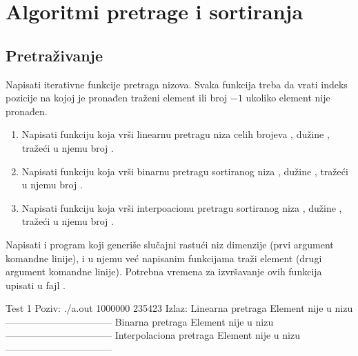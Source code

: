 
\chapter{Algoritmi pretrage i sortiranja}

\section{Pretraživanje}

\begin{Exercise}[label=401]
  Napisati iterativne funkcije pretraga nizova. Svaka funkcija treba
  da vrati indeks pozicije na kojoj je pronađen traženi element ili
  broj $-1$ ukoliko element nije pronađen.
  \begin{enumerate}  
  \item Napisati funkciju koja vrši linearnu pretragu niza 
    celih brojeva , dužine , tražeći u njemu broj
    .  
  \item Napisati funkciju koja vrši binarnu pretragu
    sortiranog niza , dužine , tražeći u njemu broj .
  \item Napisati funkciju koja vrši interpoacionu pretragu
    sortiranog niza , dužine , tražeći u njemu broj .
  \end{enumerate}
  Napisati i program koji generiše slučajni rastući niz dimenzije
   (prvi argument komandne linije), i u njemu već napisanim
  funkcijama traži element  (drugi argument komandne
  linije). Potrebna vremena za izvršavanje ovih funkcija upisati u
  fajl .
  
\begin{maxitest}
\begin{test}{Test 1}
Poziv: ./a.out 1000000 235423
Izlaz:
Linearna pretraga
Element nije u nizu
---------------------------------
Binarna pretraga
Element nije u nizu
---------------------------------
Interpolaciona pretraga
Element nije u nizu
---------------------------------
\end{test}
\end{maxitest}


\end{Exercise}

\begin{Answer}[ref=401]
\end{Answer}

